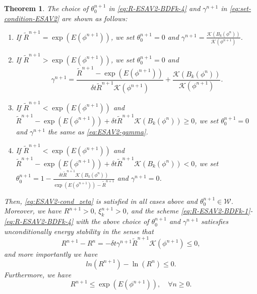 \documentclass[final,review,onefignum,onetabnum]{siamart190516}
\theoremstyle{plain}
\newtheorem{thm}{Theorem}[section]
\begin{document}
\begin{thm}\label{Th:ESAV2-stability}
The choice of $\theta_{0}^{n+1}$ in \eqref{eq:R-ESAV2-BDFk-4} and $\gamma^{n+1}$ in \eqref{eq:set-condition-ESAV2} are shown as follows:
\begin{enumerate}
\item If $\tilde{R}^{n+1} = \exp\left(E(\phi^{n+1})\right)$, we set $\theta_{0}^{n+1}=0$ and $\gamma^{n+1}=\frac{\mathcal{K}\left( B_{k}(\phi^{n})\right)}{\mathcal{K}( {\phi}^{n+1})}$.
\item If $\tilde{R}^{n+1} > \exp\left(E(\phi^{n+1})\right)$, we set $\theta_{0}^{n+1}=0$ and
\begin{equation}\label{eq:ESAV2-gamma}
\gamma^{n+1} = \frac{\tilde{R}^{n+1}-\exp\left(E(\phi^{n+1})\right)}{\delta t \tilde{R}^{n+1}\mathcal{K}(\phi^{n+1})} + \frac{\mathcal{K}\left( B_{k}(\phi^{n})\right)}{\mathcal{K}( {\phi}^{n+1})}.
\end{equation}
\item If $\tilde{R}^{n+1} < \exp\left(E(\phi^{n+1})\right)$ and $\tilde{R}^{n+1}-\exp\left(E(\phi^{n+1})\right)+ \delta t \tilde{R}^{n+1} \mathcal{K}\left( B_{k}(\phi^{n})\right) \geq 0$, we set $\theta_{0}^{n+1}=0$ and 	
$\gamma^{n+1}$ the same as \eqref{eq:ESAV2-gamma}. 	
\item  If $\tilde{R}^{n+1} < \exp\left(E(\phi^{n+1})\right)$ and $\tilde{R}^{n+1}-\exp\left(E(\phi^{n+1})\right)+ \delta t \tilde{R}^{n+1}\mathcal{K}\left( B_{k}(\phi^{n})\right)< 0$, we set $\theta_{0}^{n+1}=1-\frac{\delta t \tilde{R}^{n+1} \mathcal{K}\left( B_{k}(\phi^{n})\right)}{\exp\left(E(\phi^{n+1})\right)-\tilde{R}^{n+1}}$ and 
$\gamma^{n+1}=0$.
	\end{enumerate}
Then,  \eqref{eq:ESAV2-cond_zeta} is satisfied in all cases above and  $\theta_0^{n+1}\in \mathcal{W}$. 
Moreover, we have $R^{n+1}> 0,\, \xi_{k}^{n+1} > 0$, and the scheme \eqref{eq:R-ESAV2-BDFk-1}-\eqref{eq:R-ESAV2-BDFk-4} with the above choice of  $\theta_0^{n+1}$ and  $\gamma^{n+1}$  satiesfies unconditionally energy stability in the sense that
\begin{equation}\label{eq:ESAV2-stability}
	R^{n+1} - R^{n} = -\delta t \gamma^{n+1} \tilde{R}^{n+1} \mathcal{K}( {\phi}^{n+1})\leq 0,
\end{equation}
and more importantly we have 
\begin{equation}\label{eq:ESAV2-stability-1}
	ln\left(R^{n+1}\right) - \ln\left(R^{n}\right) \leq 0.
\end{equation}
Furthermore, we have 
\begin{equation}\label{eq:stability2}
	R^{n+1}\le \exp\left(E(\phi^{n+1})\right), \quad\forall n\ge 0.
\end{equation}


\end{thm}
\end{document}
